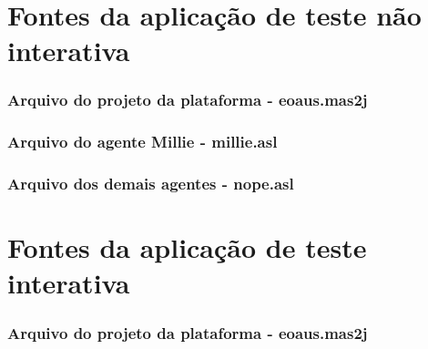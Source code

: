 %
%
%
%
%
%
%
\chapter{Fontes da aplicação de teste não interativa}
\subsection*{Arquivo do projeto da plataforma - eoaus.mas2j} \label{atni}


\subsection*{Arquivo do agente Millie - millie.asl}


\subsection*{Arquivo dos demais agentes - nope.asl}


\chapter{Fontes da aplicação de teste interativa}
\subsection*{Arquivo do projeto da plataforma - eoaus.mas2j}


